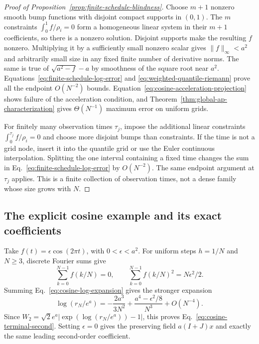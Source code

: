 \begin{proof}[Proof of Proposition~\ref{prop:finite-schedule-blindness}]
Choose $m+1$ nonzero smooth bump functions with disjoint compact
supports in $(0,1)$.  The $m$ constraints
$\int_0^1 f/\rho_i=0$ form a homogeneous linear system in their
$m+1$ coefficients, so there is a nonzero solution.  Disjoint
supports make the resulting $f$ nonzero.  Multiplying it by a
sufficiently small nonzero scalar gives $\|f\|_\infty<a^2$ and
arbitrarily small size in any fixed finite number of derivative
norms.  The same is true of $\sqrt{a^2-f}-a$ by smoothness of the
square root near $a^2$.  Equations~\eqref{eq:finite-schedule-log-error}
and \eqref{eq:weighted-quantile-riemann} prove all the endpoint
$O(N^{-2})$ bounds.  Equation~\eqref{eq:cosine-acceleration-projection}
shows failure of the acceleration condition, and
Theorem~\ref{thm:global-ap-characterization} gives
$\Theta(N^{-1})$ maximum error on uniform grids.

For finitely many observation times $\tau_j$, impose the additional
linear constraints $\int_0^{\tau_j}f/\rho_i=0$ and choose more
disjoint bumps than constraints.  If the time is not a grid node,
insert it into the quantile grid or use the Euler continuous
interpolation.  Splitting the one interval containing a fixed time
changes the sum in Eq.~\eqref{eq:finite-schedule-log-error} by
$O(N^{-2})$.  The same endpoint argument at $\tau_j$ applies.
This is a finite collection of observation times, not a dense family
whose size grows with $N$.
\end{proof}

\subsection{The explicit cosine example and its exact coefficients}

Take $f(t)=\epsilon\cos(2\pi t)$, with $0<\epsilon<a^2$.
For uniform steps $h=1/N$ and $N\ge3$, discrete Fourier sums give
\[
 \sum_{k=0}^{N-1}f(k/N)=0,\qquad
 \sum_{k=0}^{N-1}f(k/N)^2=N\epsilon^2/2.
\]
Summing Eq.~\eqref{eq:cosine-log-expansion} gives the stronger expansion
\begin{equation}
 \log(r_N/e^a)
 =-\frac{2a^3}{3N^2}
    +\frac{a^4-\epsilon^2/8}{N^3}+O(N^{-4}).
 \label{eq:cosine-terminal-log-expansion}
\end{equation}
Since $W_2=\sqrt2 e^a|\exp(\log(r_N/e^a))-1|$, this proves
Eq.~\eqref{eq:cosine-terminal-second}.  Setting $\epsilon=0$
gives the preserving field $a(I+J)x$ and exactly the same leading
second-order coefficient.

